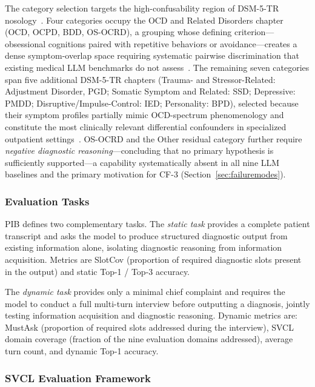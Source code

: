 \documentclass[conference]{IEEEtran}
\begin{document}
The category selection targets the high-confusability region of DSM-5-TR nosology~\cite{apa2022dsm5tr}. Four categories occupy the OCD and Related Disorders chapter (OCD, OCPD, BDD, OS-OCRD), a grouping whose defining criterion---obsessional cognitions paired with repetitive behaviors or avoidance---creates a dense symptom-overlap space requiring systematic pairwise discrimination that existing medical LLM benchmarks do not assess~\cite{jin2021disease,jin2019pubmedqa,pal2022medmcqa}. The remaining seven categories span five additional DSM-5-TR chapters (Trauma- and Stressor-Related: Adjustment Disorder, PGD; Somatic Symptom and Related: SSD; Depressive: PMDD; Disruptive/Impulse-Control: IED; Personality: BPD), selected because their symptom profiles partially mimic OCD-spectrum phenomenology and constitute the most clinically relevant differential confounders in specialized outpatient settings~\cite{apa2022dsm5tr}. OS-OCRD and the Other residual category further require \textit{negative diagnostic reasoning}---concluding that no primary hypothesis is sufficiently supported---a capability systematically absent in all nine LLM baselines and the primary motivation for CF-3 (Section~\ref{sec:failuremodes}).

\subsubsection{Evaluation Tasks}

PIB defines two complementary tasks. The \textit{static task} provides a complete patient transcript and asks the model to produce structured diagnostic output from existing information alone, isolating diagnostic reasoning from information acquisition. Metrics are SlotCov (proportion of required diagnostic slots present in the output) and static Top-1 / Top-3 accuracy.

The \textit{dynamic task} provides only a minimal chief complaint and requires the model to conduct a full multi-turn interview before outputting a diagnosis, jointly testing information acquisition and diagnostic reasoning. Dynamic metrics are: MustAsk (proportion of required slots addressed during the interview), SVCL domain coverage (fraction of the nine evaluation domains addressed), average turn count, and dynamic Top-1 accuracy.

\subsubsection{SVCL Evaluation Framework}
\end{document}
